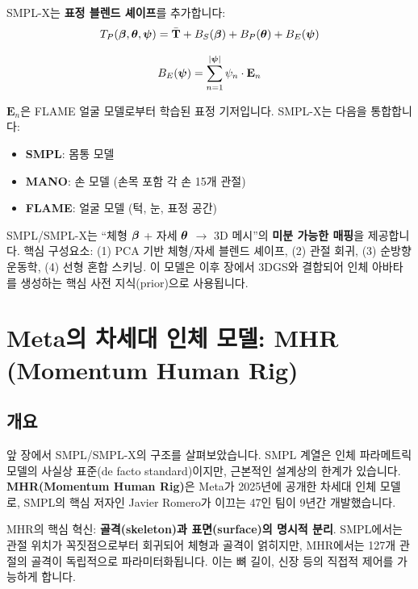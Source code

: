 \documentclass[11pt, a4paper]{report}
\begin{document}
SMPL-X는 \textbf{표정 블렌드 셰이프}를 추가합니다:
\begin{equation}
T_P(\bm{\beta}, \bm{\theta}, \bm{\psi}) = \bar{\mathbf{T}} + B_S(\bm{\beta}) + B_P(\bm{\theta}) + B_E(\bm{\psi})
\end{equation}

\begin{equation}
B_E(\bm{\psi}) = \sum_{n=1}^{|\bm{\psi}|} \psi_n \cdot \mathbf{E}_n
\end{equation}

$\mathbf{E}_n$은 FLAME 얼굴 모델로부터 학습된 표정 기저입니다. SMPL-X는 다음을 통합합니다:
\begin{itemize}[leftmargin=*]
  \item \textbf{SMPL}: 몸통 모델
  \item \textbf{MANO}: 손 모델 (손목 포함 각 손 15개 관절)
  \item \textbf{FLAME}: 얼굴 모델 (턱, 눈, 표정 공간)
\end{itemize}

\begin{summary}
SMPL/SMPL-X는 ``체형 $\bm{\beta}$ + 자세 $\bm{\theta}$ $\rightarrow$ 3D 메시''의 \textbf{미분 가능한 매핑}을 제공합니다. 핵심 구성요소: (1) PCA 기반 체형/자세 블렌드 셰이프, (2) 관절 회귀, (3) 순방향 운동학, (4) 선형 혼합 스키닝. 이 모델은 이후 장에서 3DGS와 결합되어 인체 아바타를 생성하는 핵심 사전 지식(prior)으로 사용됩니다.
\end{summary}


\chapter{Meta의 차세대 인체 모델: MHR (Momentum Human Rig)}
\label{ch:mhr}

\section{개요}

앞 장에서 SMPL/SMPL-X의 구조를 살펴보았습니다. SMPL 계열은 인체 파라메트릭 모델의 사실상 표준(de facto standard)이지만, 근본적인 설계상의 한계가 있습니다. \textbf{MHR(Momentum Human Rig)}은 Meta가 2025년에 공개한 차세대 인체 모델로, SMPL의 핵심 저자인 Javier Romero가 이끄는 47인 팀이 9년간 개발했습니다.

\begin{keyidea}
MHR의 핵심 혁신: \textbf{골격(skeleton)과 표면(surface)의 명시적 분리}. SMPL에서는 관절 위치가 꼭짓점으로부터 회귀되어 체형과 골격이 얽히지만, MHR에서는 127개 관절의 골격이 독립적으로 파라미터화됩니다. 이는 뼈 길이, 신장 등의 직접적 제어를 가능하게 합니다.
\end{keyidea}
\end{document}
